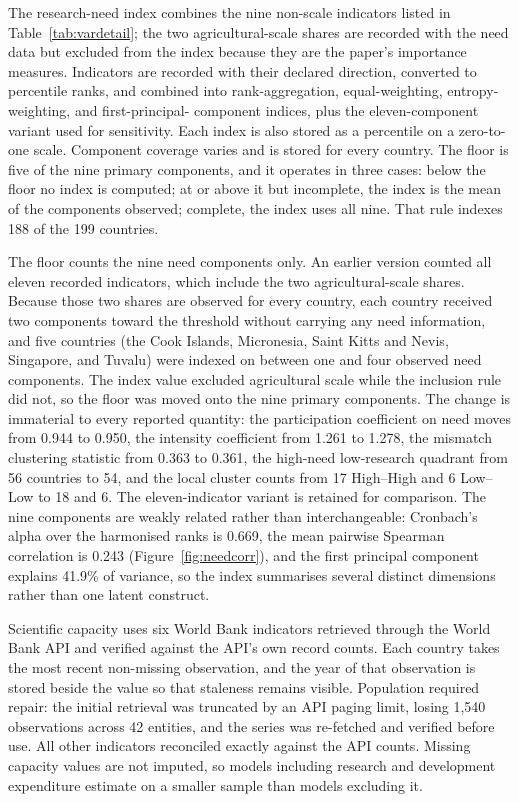 \documentclass[ASNA,twocolumn]{USG}
\begin{document}

The research-need index combines the nine non-scale indicators listed in
Table~\ref{tab:vardetail}; the two agricultural-scale shares are recorded with the need
data but excluded from the index because they are the paper's importance measures.
Indicators are recorded with their declared direction, converted to percentile ranks, and
combined into rank-aggregation, equal-weighting, entropy-weighting, and first-principal-
component indices, plus the eleven-component variant used for sensitivity. Each index is also stored as
a percentile on a zero-to-one scale. Component coverage varies and is stored for every country. The floor is five of the nine primary
components, and it operates in three cases: below the floor no index is computed; at or above it
but incomplete, the index is the mean of the components observed; complete, the index uses all
nine. That rule indexes 188 of the 199 countries.

The floor counts the nine need components only. An earlier version counted all eleven recorded
indicators, which include the two agricultural-scale shares. Because those two shares are observed
for every country, each country received two components toward the threshold without carrying any
need information, and five countries (the Cook Islands, Micronesia, Saint Kitts and Nevis,
Singapore, and Tuvalu) were indexed on between one and four observed need components. The index
value excluded agricultural scale while the inclusion rule did not, so the floor was moved onto
the nine primary components. The change is immaterial to every reported quantity: the
participation coefficient on need moves from 0.944 to 0.950, the intensity coefficient from 1.261
to 1.278, the mismatch clustering statistic from 0.363 to 0.361, the high-need low-research
quadrant from 56 countries to 54, and the local cluster counts from 17 High--High and 6 Low--Low
to 18 and 6. The eleven-indicator variant is retained for comparison. The nine components are weakly related rather than
interchangeable: Cronbach's alpha over the harmonised ranks is 0.669, the mean pairwise Spearman correlation is 0.243 (Figure~\ref{fig:needcorr}), and the first
principal component explains 41.9\% of variance, so the index
summarises several distinct dimensions rather than one latent construct.


Scientific capacity uses six World Bank indicators retrieved through the World Bank API and
verified against the API's own record counts. Each country takes the most recent non-missing
observation, and the year of that observation is stored beside the value so that staleness
remains visible. Population required repair: the initial retrieval was truncated by an API
paging limit, losing 1,540 observations across 42 entities, and the series was re-fetched and
verified before use. All other indicators reconciled exactly against the API counts. Missing
capacity values are not imputed, so models including research and development expenditure
estimate on a smaller sample than models excluding it.
\end{document}
